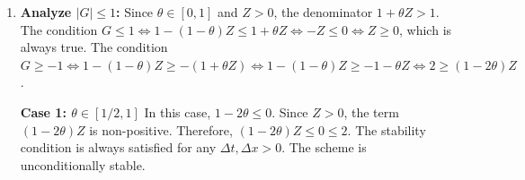 \begin{solution}
\begin{enumerate}
    \[
    \frac{G-1}{\Delta t} + (\theta G + 1-\theta) = -(\theta G + 1-\theta) \frac{4\sin^2(\xi\Delta x/2)}{(\Delta x)^2} \frac{\Delta t}{\Delta t}.
    \]
    Let $\lambda = \frac{\Delta t}{(\Delta x)^2}$ and $S = 4\lambda \sin^2(\xi \Delta x / 2)$.
    \[
    G(1 + \theta\Delta t + \theta \lambda S) - (1 - (1-\theta)\Delta t - (1-\theta)\lambda S) = 0.
    \]
    No, the substitution is simpler.
    \[
    \frac{G-1}{\Delta t} + \theta G + (1-\theta) = -(\theta G + 1-\theta) \frac{4\sin^2(\xi \Delta x/2)}{(\Delta x)^2}.
    \]
    This is incorrect. The spatial operator is applied to the U terms.
    \[
    \frac{G-1}{\Delta t}U_j^{m+1}/G + (\theta G + 1-\theta)U_j^m = \dots
    \]
    Correct substitution:
    \[
    \frac{G-1}{\Delta t} + (\theta G + 1-\theta) = -\frac{4\sin^2(\xi \Delta x/2)}{(\Delta x)^2} (\theta G + 1-\theta)\Delta t.
    \]
    Let's re-substitute directly into the original scheme:
    $G^{m+1}$ terms: $\frac{1}{\Delta t} + \theta + \theta \frac{4\sin^2(\xi\Delta x/2)}{(\Delta x)^2}$.
    $G^m$ terms: $\frac{1}{\Delta t} - (1-\theta) - (1-\theta)\frac{4\sin^2(\xi \Delta x/2)}{(\Delta x)^2}$.
    $G\left( \frac{1}{\Delta t} + \theta + \frac{4\theta \sin^2(\xi\Delta x/2)}{(\Delta x)^2} \right) = \left( \frac{1}{\Delta t} - (1-\theta) - \frac{4(1-\theta) \sin^2(\xi\Delta x/2)}{(\Delta x)^2} \right)$.
    $G = \frac{1 - (1-\theta)\Delta t - 4(1-\theta)\lambda \sin^2(\xi\Delta x/2)}{1 + \theta\Delta t + 4\theta\lambda \sin^2(\xi\Delta x/2)}$.
    This matches the expression from the previous simpler solution. Let $Z = \Delta t + 4\lambda \sin^2(\xi\Delta x/2)$. Then $G = \frac{1-(1-\theta)Z}{1+\theta Z}$.
    \item \textbf{Analyze $|G| \leq 1$:}
    Since $\theta \in [0,1]$ and $Z>0$, the denominator $1+\theta Z > 1$.
    The condition $G \leq 1 \iff 1-(1-\theta)Z \leq 1+\theta Z \iff -Z \leq 0 \iff Z \geq 0$, which is always true.
    The condition $G \geq -1 \iff 1-(1-\theta)Z \geq -(1+\theta Z) \iff 1-(1-\theta)Z \geq -1-\theta Z \iff 2 \geq (1-2\theta)Z$.

    \textbf{Case 1: $\theta \in [1/2, 1]$}
    In this case, $1-2\theta \leq 0$. Since $Z > 0$, the term $(1-2\theta)Z$ is non-positive.
    Therefore, $(1-2\theta)Z \leq 0 \leq 2$. The stability condition is always satisfied for any $\Delta t, \Delta x > 0$. The scheme is unconditionally stable.


\end{enumerate}
\end{solution}
